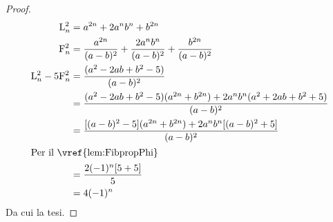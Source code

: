 \begin{proof}
	\begin{align*}
		\Luc{n}^2={}            & a^{2n}+2a^nb^n+b^{2n}                                                        \\
		\Fib{n}^2={}            & \dfrac{a^{2n}}{(a-b)^2}+\dfrac{2a^{n}b^{n}}{(a-b)^2}+\dfrac{b^{2n}}{(a-b)^2} \\
		\Luc{n}^2-5\Fib{n}^2={} & \dfrac{(a^2-2ab+b^2-5)}{(a-b)^2}                                             \\
		={}                     & \dfrac{(a^2-2ab+b^2-5)(a^{2n}+b^{2n})+2a^nb^n(a^2+2ab+b^2+5)}{(a-b)^2}       \\
		={}                     & \dfrac{[(a-b)^2-5](a^{2n}+b^{2n})+2a^nb^n[(a-b)^2+5]}{(a-b)^2}               \\
		\intertext{Per il~\vref{lem:FibpropPhi}}
		={}                     & \dfrac{2(-1)^n[5+5]}{5}                                                      \\
		={}                     & 4(-1)^n                                                                      \\
	\end{align*}
	Da cui la tesi.
\end{proof}
